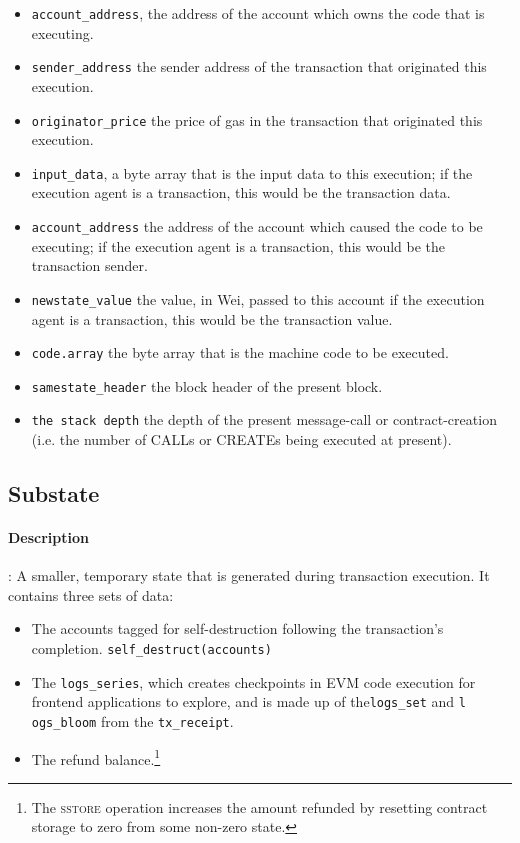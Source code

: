 \documentclass[10pt,a4paper,leqno,bibliography=totoc]{scrartcl}
\newenvironment{alphafootnotes}
{\par\edef\savedfootnotenumber{\number\value{footnote}}
\renewcommand{\thefootnote}{\alph{footnote}}
\setcounter{footnote}{0}}
{\par\setcounter{footnote}{\savedfootnotenumber}}
\begin{document}
\begin{alphafootnotes}
\begin{multicols*}{2}
				\begin{itemize}
					\item \texttt{account\_address}, the address of the account which owns the code that is executing.
					\item \texttt{sender\_address} the sender address of the transaction that originated this execution.
					\item \texttt{originator\_price} the price of gas in the transaction that originated this execution.
					\item \texttt{input\_data}, a byte array that is the input data to this execution; if the execution agent is a transaction, this would be the transaction data.
					\item \texttt{account\_address}  the address of the account which caused the code to be executing; if the execution agent is a transaction, this would be the transaction sender.
					\item \texttt{newstate\_value} the value, in Wei, passed to this account if the execution agent is a transaction, this would be the transaction value.\supercite{Wood2017}
					\item \texttt{code.array} the byte array that is the machine code to be executed.\supercite{Wood2017}
					\item \texttt{samestate\_header} the block header of the present block.
					\item \texttt{the stack depth} the depth of the present message-call or contract-creation (i.e. the number of {\small CALL}s or {\small CREATE}s being executed at present).\supercite{Wood2017}
				\end{itemize}
				\subsection{Substate}
				\paragraph{Description}: A smaller, temporary state that is generated during transaction execution. It contains three sets of data:

\begin{itemize}
        \item The accounts tagged for self-destruction following the transaction's completion. \texttt{self\_destruct(accounts)}
        \item The \texttt{logs\_series}, which creates checkpoints in EVM code execution for frontend applications to explore, and is made up of the\texttt{logs\_set} and \texttt{l
ogs\_bloom} from the \texttt{tx\_receipt}.
	\item The refund balance.\footnote{The \textsc{sstore} operation increases the amount refunded by resetting contract storage to zero from some non-zero state.}
\end{itemize}


\end{multicols*}
\end{alphafootnotes}
\end{document}
